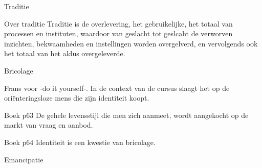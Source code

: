 \documentclass[main.tex]{subfiles}
\begin{document}
\begin{examenvraag}
    \begin{vraag}
        Traditie
    \end{vraag}

    \begin{antwoord}
    
    \begin{citaat}{Over traditie}
    Traditie is de overlevering, het gebruikelijke, het totaal van processen en 
    instituten, waardoor van geslacht tot geslcaht de verworven inzichten,
    bekwaamheden en instellingen worden overgelverd, en vervolgends ook het totaal 
    van het aldus overgeleverde.
    \end{citaat}
    \end{antwoord}
\end{examenvraag}

\begin{examenvraag}
    \begin{vraag}
        Bricolage
    \end{vraag}

    \begin{antwoord}
		Frans voor -do it yourself-. In de context van de cursus slaagt het op de ori\"{e}nteringsloze mens die zijn identiteit koopt. 
		  \begin{citaat}{Boek p63}
		De gehele levensstijl die men zich aanmeet, wordt aangekocht op de markt van vraag en aanbod.
        \end{citaat}
       \begin{citaat}{Boek p64}
		Identiteit is een kwestie van bricolage.
        \end{citaat}
    \end{antwoord}
   
\end{examenvraag}

\begin{examenvraag}
    \begin{vraag}
        Emancipatie
    \end{vraag}

    \begin{antwoord}
    \end{antwoord}
\end{examenvraag}
\end{document}
